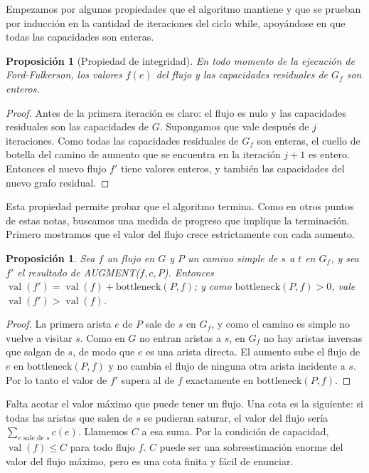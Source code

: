 \documentclass[12pt, spanish, oneside, openany]{book}
\newcommand{\alg}[1]{#1}
\theoremstyle{uprightplain}
\newtheorem{proposicion}[teorema]{Proposición}
\theoremstyle{definition}
\theoremstyle{remark}
\theoremstyle{definition}
\newcommand{\val}{\operatorname{val}}   %
\begin{document}
Empezamos por algunas propiedades que el algoritmo mantiene y que se prueban por inducción en la cantidad de iteraciones del ciclo while, apoyándose en que todas las capacidades son enteras.

\begin{proposicion}[Propiedad de integridad]
\label{prop:flujo-integridad}
En todo momento de la ejecución de Ford-Fulkerson, los valores $f(e)$ del flujo y las capacidades residuales de $G_f$ son enteros.
\end{proposicion}
\begin{proof}
Antes de la primera iteración es claro: el flujo es nulo y las capacidades residuales son las capacidades de $G$. Supongamos que vale después de $j$ iteraciones. Como todas las capacidades residuales de $G_f$ son enteras, el cuello de botella del camino de aumento que se encuentra en la iteración $j+1$ es entero. Entonces el nuevo flujo $f'$ tiene valores enteros, y también las capacidades del nuevo grafo residual.
\end{proof}

Esta propiedad permite probar que el algoritmo termina. Como en otros puntos de estas notas, buscamos una medida de progreso que implique la terminación. Primero mostramos que el valor del flujo crece estrictamente con cada aumento.

\begin{proposicion}
\label{prop:flujo-aumento-valor}
Sea $f$ un flujo en $G$ y $P$ un camino simple de $s$ a $t$ en $G_f$, y sea $f'$ el resultado de \alg{AUGMENT}($f,c,P$). Entonces $\val(f')=\val(f)+\mathrm{bottleneck}(P,f)$; y como $\mathrm{bottleneck}(P,f)>0$, vale $\val(f')>\val(f)$.
\end{proposicion}
\begin{proof}
La primera arista $e$ de $P$ sale de $s$ en $G_f$, y como el camino es simple no vuelve a visitar $s$. Como en $G$ no entran aristas a $s$, en $G_f$ no hay aristas inversas que salgan de $s$, de modo que $e$ es una arista directa. El aumento sube el flujo de $e$ en $\mathrm{bottleneck}(P,f)$ y no cambia el flujo de ninguna otra arista incidente a $s$. Por lo tanto el valor de $f'$ supera al de $f$ exactamente en $\mathrm{bottleneck}(P,f)$.
\end{proof}

Falta acotar el valor máximo que puede tener un flujo. Una cota es la siguiente: si todas las aristas que salen de $s$ se pudieran saturar, el valor del flujo sería $\sum_{e\text{ sale de }s}c(e)$. Llamemos $C$ a esa suma. Por la condición de capacidad, $\val(f)\le C$ para todo flujo $f$. $C$ puede ser una sobreestimación enorme del valor del flujo máximo, pero es una cota finita y fácil de enunciar.
\end{document}
